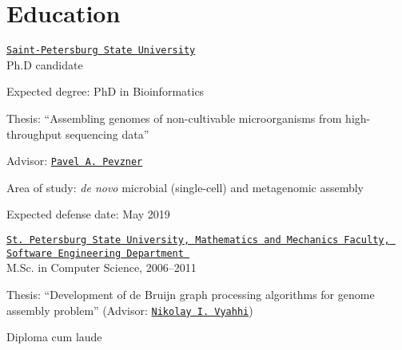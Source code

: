 \section{Education}
%
%
\href{http://english.spbu.ru/}{\tt Saint-Petersburg State University}\\
  Ph.D candidate
\begin{innerlist}
  \item Expected degree: PhD in Bioinformatics
  \item Thesis: ``Assembling genomes of non-cultivable microorganisms from high-throughput sequencing data''
  \item Advisor: \href{http://cseweb.ucsd.edu/~ppevzner/}{\tt Pavel A.~Pevzner}
  \item Area of study: \textit{de novo} microbial (single-cell) and metagenomic assembly
  \item Expected defense date: May 2019
\end{innerlist}

\blankline

\href{http://www.math.spbu.ru/en/index.html}{\tt St.~Petersburg State University, Mathematics and Mechanics Faculty, Software Engineering Department 
}\\
  M.Sc. in Computer Science, 2006--2011 %
\begin{innerlist}
  \item Thesis: ``Development of de Bruijn graph processing algorithms
        for genome assembly problem'' (Advisor: \href{http://spbsu.ru/vyahhi/}{\tt Nikolay I.~Vyahhi})
  \item Diploma cum laude
\end{innerlist}

